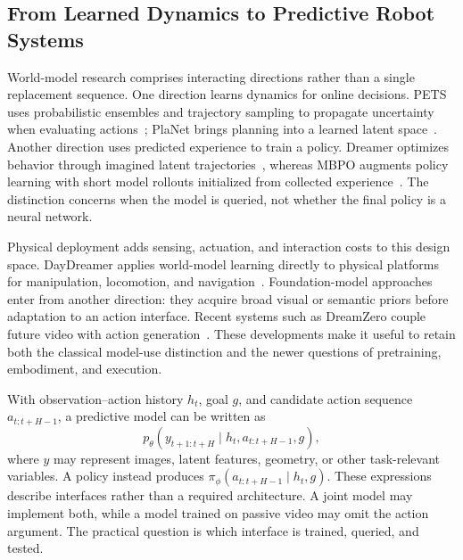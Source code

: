 \subsection{From Learned Dynamics to Predictive Robot Systems}
World-model research comprises interacting directions rather than a single replacement sequence. One direction learns dynamics for online decisions. PETS uses probabilistic ensembles and trajectory sampling to propagate uncertainty when evaluating actions~\cite{chua2018pets}; PlaNet brings planning into a learned latent space~\cite{hafner2019planet}. Another direction uses predicted experience to train a policy. Dreamer optimizes behavior through imagined latent trajectories~\cite{hafner2020dreamer}, whereas MBPO augments policy learning with short model rollouts initialized from collected experience~\cite{janner2019mbpo}. The distinction concerns when the model is queried, not whether the final policy is a neural network.

Physical deployment adds sensing, actuation, and interaction costs to this design space. DayDreamer applies world-model learning directly to physical platforms for manipulation, locomotion, and navigation~\cite{wu2023daydreamer}. Foundation-model approaches enter from another direction: they acquire broad visual or semantic priors before adaptation to an action interface. Recent systems such as DreamZero couple future video with action generation~\cite{ye2026dreamzero}. These developments make it useful to retain both the classical model-use distinction and the newer questions of pretraining, embodiment, and execution.

With observation--action history $h_t$, goal $g$, and candidate action sequence $a_{t:t+H-1}$, a predictive model can be written as
\begin{equation}
 p_\theta(y_{t+1:t+H}\mid h_t,a_{t:t+H-1},g),
 \label{eq:predictor}
\end{equation}
where $y$ may represent images, latent features, geometry, or other task-relevant variables. A policy instead produces $\pi_\phi(a_{t:t+H-1}\mid h_t,g)$. These expressions describe interfaces rather than a required architecture. A joint model may implement both, while a model trained on passive video may omit the action argument. The practical question is which interface is trained, queried, and tested.

